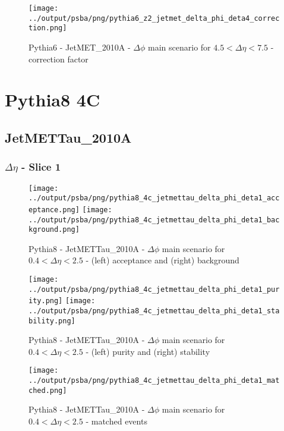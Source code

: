 \documentclass[11pt]{book}
\begin{document}
\begin{figure}[ht]
\centering
\texttt{[image: ../output/psba/png/pythia6\_z2\_jetmet\_delta\_phi\_deta4\_correction.png]}
\caption{Pythia6 - JetMET\_2010A - $\Delta\phi$ main scenario for $4.5 < \Delta\eta < 7.5$ - correction factor}
\label{fig:p6_jetmet_delta_phi_deta4_correction}
\end{figure}

\clearpage
\section{Pythia8 4C}
\subsection{JetMETTau\_2010A}

\subsubsection{$\Delta\eta$ - Slice 1}

\begin{figure}[ht]
\centering
\texttt{[image: ../output/psba/png/pythia8\_4c\_jetmettau\_delta\_phi\_deta1\_acceptance.png]}
\texttt{[image: ../output/psba/png/pythia8\_4c\_jetmettau\_delta\_phi\_deta1\_background.png]}
\caption{Pythia8 - JetMETTau\_2010A - $\Delta\phi$ main scenario for $0.4 < \Delta\eta < 2.5$ - (left) acceptance and (right) background}
\label{fig:p8_jetmettau_delta_phi_deta1_ab}
\end{figure}

\begin{figure}[ht]
\centering
\texttt{[image: ../output/psba/png/pythia8\_4c\_jetmettau\_delta\_phi\_deta1\_purity.png]}
\texttt{[image: ../output/psba/png/pythia8\_4c\_jetmettau\_delta\_phi\_deta1\_stability.png]}
\caption{Pythia8 - JetMETTau\_2010A - $\Delta\phi$ main scenario for $0.4 < \Delta\eta < 2.5$ - (left) purity and (right) stability}
\label{fig:p8_jetmettau_delta_phi_deta1_ps}
\end{figure}

\begin{figure}[ht]
\centering
\texttt{[image: ../output/psba/png/pythia8\_4c\_jetmettau\_delta\_phi\_deta1\_matched.png]}
\caption{Pythia8 - JetMETTau\_2010A - $\Delta\phi$ main scenario for $0.4 < \Delta\eta < 2.5$ - matched events}
\label{fig:p8_jetmettau_delta_phi_deta1_matched}
\end{figure}
\end{document}
